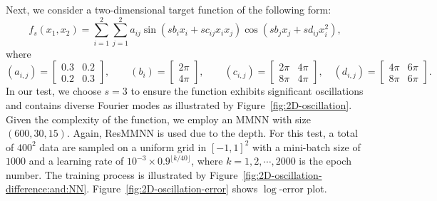 \documentclass[review,hidelinks,onefignum,onetabnum]{siamart250211}
\begin{document}
Next, we consider a two-dimensional target function of the following form:
\begin{equation*}
	f_{s}(x_1,x_2)= \sum_{i=1}^2\sum_{j=1}^2 a_{ij} \sin(s b_i x_i+s c_{ij} x_i x_j) \cos (s b_j x_j + s d_{ij} x_i^2),
\end{equation*}
 where
\begin{equation*}
	(a_{i,j})=	\begin{bmatrix*}
		0.3 & 0.2 \\ 0.2 & 0.3
	\end{bmatrix*}, \qquad 
	(b_{i})=	\begin{bmatrix*}
		2\pi \\ 4\pi
	\end{bmatrix*},
	\qquad
	(c_{i,j})=	\begin{bmatrix*}
		2\pi & 4\pi \\ 8\pi & 4\pi
	\end{bmatrix*},  \quad 
	(d_{i,j})=	\begin{bmatrix*}
		4\pi & 6\pi \\ 8\pi & 6\pi
	\end{bmatrix*}.
\end{equation*}
In our test, we choose $s=3$ to ensure the function exhibits significant oscillations and contains diverse Fourier modes as illustrated by Figure~\ref{fig:2D-oscillation}. Given the complexity of the function, we employ an MMNN with size $(600, 30, 15)$. Again, ResMMNN is used due to the depth. For this test, a total of $400^2$ data are sampled on a uniform grid in $[-1,1]^2$ with a mini-batch size of $1000$ and a learning rate of $10^{-3}\times 0.9^{\lfloor k/40 \rfloor}$, where $k=1,2,\cdots,2000$ is the epoch number. The training process is illustrated by Figure~\ref{fig:2D-oscillation-difference:and:NN}. Figure~\ref{fig:2D-oscillation-error} shows $\log$-error plot.
\end{document}
